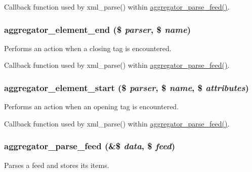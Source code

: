 Callback function used by xml\_\-parse() within \hyperlink{aggregator_8parser_8inc_ad522d879ccf727d519a0d0d21dca1f53}{aggregator\_\-parse\_\-feed()}. \hypertarget{aggregator_8parser_8inc_a95d93d9f36d0aed0985f06080951f570}{
\subsubsection[{aggregator\_\-element\_\-end}]{\setlength{\rightskip}{0pt plus 5cm}aggregator\_\-element\_\-end (\$ {\em parser}, \/  \$ {\em name})}}
\label{aggregator_8parser_8inc_a95d93d9f36d0aed0985f06080951f570}
Performs an action when a closing tag is encountered.

Callback function used by xml\_\-parse() within \hyperlink{aggregator_8parser_8inc_ad522d879ccf727d519a0d0d21dca1f53}{aggregator\_\-parse\_\-feed()}. \hypertarget{aggregator_8parser_8inc_ac2a88dc406806e315a455cb576cc687a}{
\subsubsection[{aggregator\_\-element\_\-start}]{\setlength{\rightskip}{0pt plus 5cm}aggregator\_\-element\_\-start (\$ {\em parser}, \/  \$ {\em name}, \/  \$ {\em attributes})}}
\label{aggregator_8parser_8inc_ac2a88dc406806e315a455cb576cc687a}
Performs an action when an opening tag is encountered.

Callback function used by xml\_\-parse() within \hyperlink{aggregator_8parser_8inc_ad522d879ccf727d519a0d0d21dca1f53}{aggregator\_\-parse\_\-feed()}. \hypertarget{aggregator_8parser_8inc_ad522d879ccf727d519a0d0d21dca1f53}{
\subsubsection[{aggregator\_\-parse\_\-feed}]{\setlength{\rightskip}{0pt plus 5cm}aggregator\_\-parse\_\-feed (\&\$ {\em data}, \/  \$ {\em feed})}}
\label{aggregator_8parser_8inc_ad522d879ccf727d519a0d0d21dca1f53}
Parses a feed and stores its items.


